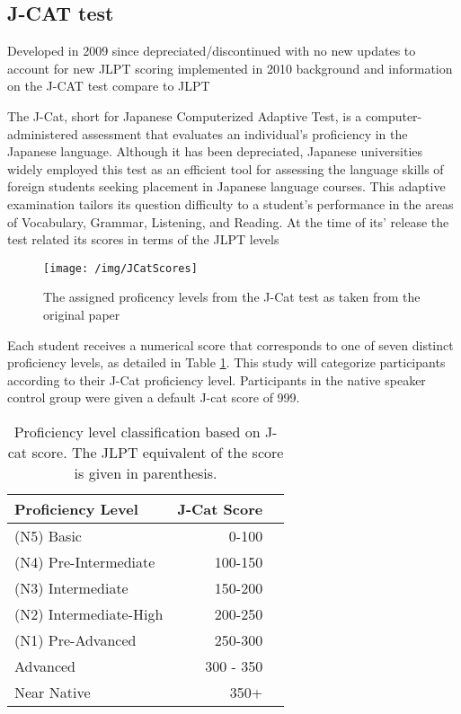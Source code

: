 \subsection{J-CAT test}
Developed in 2009 since depreciated/discontinued with no new updates to account for new JLPT scoring implemented in 2010
background and information on the J-CAT test compare to JLPT


The J-Cat, short for Japanese Computerized Adaptive Test, is a computer-administered assessment that evaluates an
individual's proficiency in the Japanese language. Although it has been depreciated, Japanese universities widely
employed this test as an efficient tool for assessing the language skills of foreign students seeking placement in
Japanese language courses. This adaptive examination tailors its question difficulty to a student's performance in
the areas of Vocabulary, Grammar, Listening, and Reading. At the time of its' release the test related its scores in
terms of the JLPT levels

\begin{figure}[h]
    \centering
    \texttt{[image: /img/JCatScores]}
    \caption{The assigned proficency levels from the J-Cat test as taken from the original paper}
    \label{fig:JCatLevels}
\end{figure}

Each student receives a numerical score that corresponds to one of seven distinct proficiency levels, as detailed in
Table \ref{tab:proficency-table}. This study will categorize participants according to their J-Cat proficiency level. Participants in the
native speaker control group were given a default J-cat score of 999.

\begin{table}
\centering
\begin{tabular}{lrl}
\hline \textbf{Proficiency Level} & \textbf{J-Cat Score}  \\ \hline
(N5) Basic & 0-100 \\
(N4) Pre-Intermediate & 100-150 \\
(N3) Intermediate & 150-200 \\
(N2) Intermediate-High & 200-250 \\
(N1) Pre-Advanced & 250-300 \\
Advanced & 300 - 350 \\
Near Native & 350+\\
\hline
\end{tabular}
\caption{\label{tab:proficency-table} Proficiency level classification based on J-cat score. The JLPT equivalent of the score is given in parenthesis.}
\end{table}


